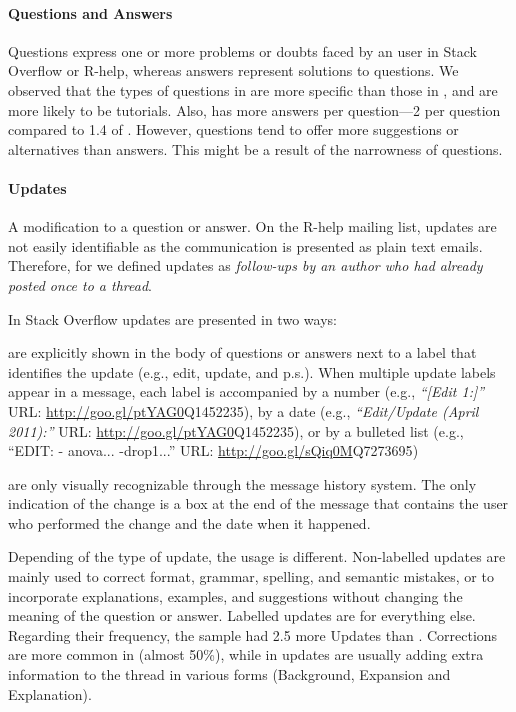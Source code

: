 
\paragraph*{Questions and Answers}
    Questions express one or more problems or doubts faced by an user in Stack Overflow or R-help, whereas answers represent solutions to questions.  We observed that the types of questions in \SO are more specific than those in \RH, and are more likely to be tutorials. Also, \SO has more answers per question---2 per question compared to 1.4 of \RH. However, \RH questions tend to offer more suggestions or alternatives than \SO answers. This might be a result of the narrowness of \SO questions.

\paragraph*{Updates}
	A modification to a question or answer.
	On the R-help mailing list, updates are not easily identifiable as the communication is presented as plain text emails.
	Therefore, for \RH we defined updates  as \emph{follow-ups by an author who had already posted once to a thread}.

	In Stack Overflow updates are presented in two ways:
	\begin{description}[itemsep=3pt, topsep=2pt, leftmargin=3em, parsep=0pt]
		\item[Labelled updates] are explicitly shown in the body of questions or answers next to a label that identifies the update (e.g., edit, update, and p.s.).
		When multiple update labels appear in a message, each label is accompanied by a number (e.g., \textit{``[Edit 1:]''} {\footnotesize URL:  \url{http://goo.gl/ptYAG0}{Q1452235}}), by a date (e.g., \textit{``Edit/Update (April 2011):''} {\footnotesize URL:  \url{http://goo.gl/ptYAG0}{Q1452235}}), or by a bulleted list (e.g., ``EDIT: - anova... -drop1...'' {\footnotesize URL:  \url{http://goo.gl/sQiq0M}{Q7273695}})

		\item[Non-labelled updates] are only visually recognizable through the message history system. The only indication of the change is a box at the end of the message that contains the user who performed the change and the date when it happened.
	\end{description}

	Depending of the type of update, the usage is different.
	Non-labelled updates are mainly used to correct format, grammar, spelling, and semantic mistakes, or to incorporate explanations, examples, and suggestions without changing the meaning of the question or answer. Labelled updates are for everything else. Regarding their frequency,  the \SO sample had 2.5 more Updates than \RH.
Corrections are more common in \SO (almost 50\%), while in \RH updates are usually adding extra information to the thread in various forms (Background, Expansion and Explanation).

